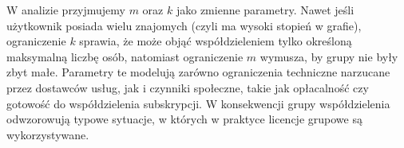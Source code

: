 W analizie przyjmujemy $m$ oraz $k$ jako zmienne parametry. Nawet jeśli użytkownik posiada wielu znajomych (czyli ma wysoki stopień w grafie), ograniczenie $k$ sprawia, że może objąć współdzieleniem tylko określoną maksymalną liczbę osób, natomiast ograniczenie $m$ wymusza, by grupy nie były zbyt małe. Parametry te modelują zarówno ograniczenia techniczne narzucane przez dostawców usług, jak i czynniki społeczne, takie jak opłacalność czy gotowość do współdzielenia subskrypcji. W konsekwencji grupy współdzielenia odwzorowują typowe sytuacje, w których w praktyce licencje grupowe są wykorzystywane.






